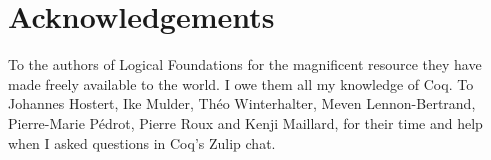 
\chapter*{Acknowledgements}
To the authors of Logical Foundations \cite{Pierce2017Logical} for the magnificent resource they have made freely
available to the world. I owe them all my knowledge of Coq. To Johannes Hostert, Ike Mulder, Théo Winterhalter, Meven 
Lennon-Bertrand, Pierre-Marie Pédrot, Pierre Roux and Kenji Maillard, for their time and help when I asked questions in 
Coq's Zulip chat.











